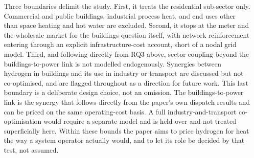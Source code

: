Three boundaries delimit the study. First, it treats the residential sub-sector
only. Commercial and public buildings, industrial process heat, and end uses
other than space heating and hot water are excluded. Second, it stops at the
meter and the wholesale market for the buildings question itself, with network
reinforcement entering through an explicit infrastructure-cost account, short of a nodal grid model. Third, and following directly from RQ3 above, sector
coupling beyond the buildings-to-power link is not modelled endogenously.
Synergies between hydrogen in buildings and its use in industry or transport are
discussed but not co-optimised, and are flagged throughout as a direction for
future work. This last boundary is a deliberate design choice, not an omission.
The buildings-to-power link is the synergy that follows directly from the
paper's own dispatch results and can be priced on the same operating-cost basis. A full industry-and-transport co-optimisation would require a separate
model and is held over and not treated superficially here. Within these bounds the paper aims to price hydrogen for heat the
way a system operator actually would, and to let its role be decided by that
test, not assumed.
